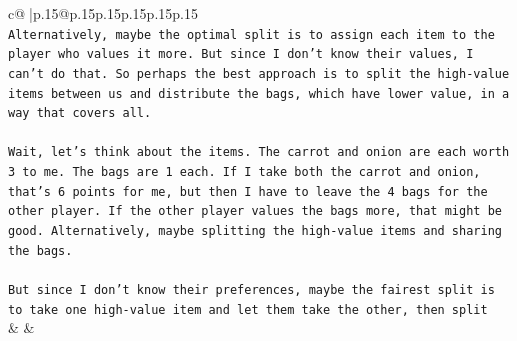\documentclass{article}
\begin{document}
{\begin{supertabular}{c@{$\;$}|p{.15\linewidth}@{}p{.15\linewidth}p{.15\linewidth}p{.15\linewidth}p{.15\linewidth}p{.15\linewidth}}
{{{\\ 
\texttt{Alternatively, maybe the optimal split is to assign each item to the player who values it more. But since I don't know their values, I can't do that. So perhaps the best approach is to split the high{-}value items between us and distribute the bags, which have lower value, in a way that covers all.} \\
\\ 
\texttt{Wait, let's think about the items. The carrot and onion are each worth 3 to me. The bags are 1 each. If I take both the carrot and onion, that's 6 points for me, but then I have to leave the 4 bags for the other player. If the other player values the bags more, that might be good. Alternatively, maybe splitting the high{-}value items and sharing the bags.} \\
\\ 
\texttt{But since I don't know their preferences, maybe the fairest split is to take one high{-}value item and let them take the other, then split} \\
            }
        }
    }
    & & \\ \\


\end{supertabular}}
\end{document}
